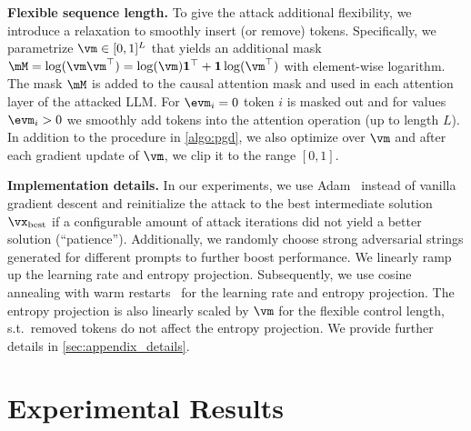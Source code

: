 \documentclass{article}
\theoremstyle{plain}
\theoremstyle{definition}
\theoremstyle{remark}
\begin{document}
\textbf{Flexible sequence length.} To give the attack additional flexibility, we introduce a relaxation to smoothly insert (or remove) tokens. Specifically, we parametrize \(\vm \in [0,1]^L\) that yields an additional mask \(\mM = \log(\vm\vm^\top) = \log(\vm)\mathbf{1}^\top + \mathbf{1}\log(\vm^\top)\) with element-wise logarithm. The mask \(\mM\) is added to the causal attention mask and used in each attention layer of the attacked LLM. For \(\evm_i = 0\) token \(i\) is masked out and for values \(\evm_i > 0\) we smoothly add tokens into the attention operation (up to length \(L\)). In addition to the procedure in \autoref{algo:pgd}, we also optimize over \(\vm\) and after each gradient update of \(\vm\), we clip it to the range \([0,1]\).

\textbf{Implementation details.} %
In our experiments, we use Adam~\citep{kingma_adam_2015} instead of vanilla gradient descent and reinitialize the attack to the best intermediate solution \(\vx_{\text{best}}\) if a configurable amount of attack iterations did not yield a better solution (``patience''). Additionally, we randomly choose strong adversarial strings generated for different prompts to further boost performance. We linearly ramp up the learning rate and entropy projection. Subsequently, we use cosine annealing with warm restarts~\cite{loshchilov_sgdr_2017} for the learning rate and entropy projection. The entropy projection is also linearly scaled by \(\vm\) for the flexible control length, s.t.\ removed tokens do not affect the entropy projection. We provide further details in \autoref{sec:appendix_details}.


\section{Experimental Results}
\end{document}
